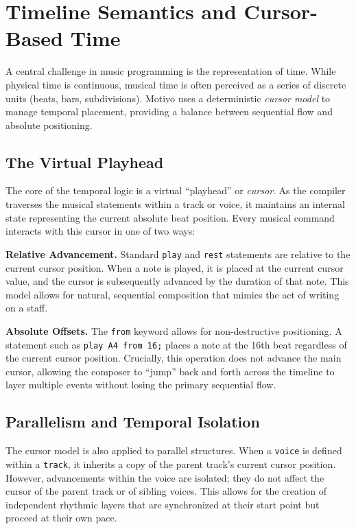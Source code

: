 \section{Timeline Semantics and Cursor-Based Time}\label{sec:temporal-model}

A central challenge in music programming is the representation of time.
While physical time is continuous, musical time is often perceived as a series of discrete units (beats, bars,
subdivisions).
Motivo uses a deterministic \textit{cursor model} to manage temporal placement, providing a balance
between sequential flow and absolute positioning.

\subsection{The Virtual Playhead}\label{detail-subsec:the-virtual-playhead}

The core of the temporal logic is a virtual ``playhead'' or \textit{cursor}.
As the compiler traverses the musical statements within a track or voice, it maintains an internal state representing
the current absolute beat position.
Every musical command interacts with this cursor in one of two ways:

\noindent \textbf{Relative Advancement.} Standard \texttt{play} and \texttt{rest} statements are relative to the current
cursor position.
When a note is played, it is placed at the current cursor value, and the cursor is subsequently advanced by the
duration of that note.
This model allows for natural, sequential composition that mimics the act of writing on a staff.

\noindent \textbf{Absolute Offsets.} The \texttt{from} keyword allows for non-destructive positioning.
A statement such as \texttt{play A4 from 16;} places a note at the 16th beat regardless of the current cursor
position.
Crucially, this operation does not advance the main cursor, allowing the composer to ``jump'' back and forth across
the timeline to layer multiple events without losing the primary sequential flow.

\subsection{Parallelism and Temporal Isolation}\label{detail-subsec:parallelism-and-temporal-isolation}

The cursor model is also applied to parallel structures.
When a \texttt{voice} is defined within a \texttt{track}, it inherits a copy of the parent track's current cursor
position.
However, advancements within the voice are isolated; they do not affect the cursor of the parent track or of sibling
voices.
This allows for the creation of independent rhythmic layers that are synchronized at their start point but proceed at
their own pace.

